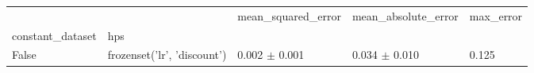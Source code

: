 \begin{tabular}{lllll}
\toprule
 &  & mean_squared_error & mean_absolute_error & max_error \\
constant_dataset & hps &  &  &  \\
\midrule
False & frozenset({'lr', 'discount'}) & 0.002 $\pm$ 0.001 & 0.034 $\pm$ 0.010 & 0.125 \\
\cline{1-5}
\bottomrule
\end{tabular}
